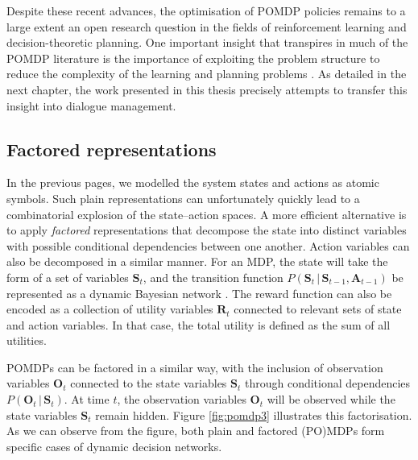Despite these recent advances, the optimisation of POMDP policies remains to a large extent an open research question in the fields of reinforcement learning and decision-theoretic planning. One important insight that transpires in much of the POMDP literature is the importance of exploiting the problem structure to reduce the complexity of the learning and planning problems \citep{Pineau:2004,poupart2005}.  As detailed in the next chapter, the work presented in this thesis precisely attempts to transfer this insight into dialogue management. 

\subsection{Factored representations}
\label{sec:factored}
In the previous pages, we modelled the system states and actions as atomic symbols.  Such plain representations can unfortunately quickly lead to a combinatorial explosion of the state--action spaces. A more efficient alternative is to apply \textit{factored} representations that decompose the state into distinct variables with possible conditional dependencies between one another.  Action variables can also be decomposed in a similar manner.  For an MDP, the state will take the form of a set of variables $\mathbf{S}_t$, and the transition function $P(\mathbf{S}_t \, | \, \mathbf{S}_{t-1},\mathbf{A}_{t-1})$ be represented as a dynamic Bayesian network \citep{boutilier1999}. The reward function can also be encoded as a collection of utility variables $\mathbf{R}_t$ connected to relevant sets of state and action variables. In that case, the total utility is defined as the sum of all utilities.

POMDPs can be factored in a similar way, with the inclusion of observation variables $\mathbf{O}_t$ connected to the state variables $\mathbf{S}_t$ through conditional dependencies $P(\mathbf{O}_t \, | \, \mathbf{S}_t)$.  At time $t$, the observation variables $\mathbf{O}_t$ will be observed while the state variables  $\mathbf{S}_t$ remain hidden. 
Figure \ref{fig:pomdp3} illustrates this factorisation. As we can observe from the figure, both plain and factored (PO)MDPs form specific cases of dynamic decision networks.

